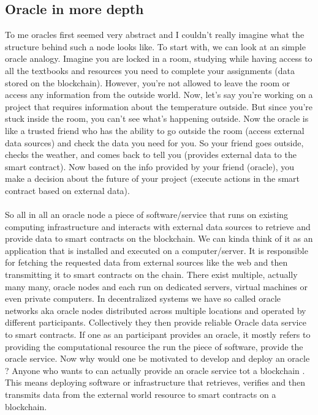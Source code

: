 \documentclass{article}
\begin{document}
\subsection{Oracle in more depth}
To me oracles first seemed very abstract and I couldn't really imagine what the structure behind such a node looks like. To start with, we can look at an simple oracle analogy. Imagine you are locked in a room, studying while having access to all the textbooks and resources you need to complete your assignments (data stored on the blockchain). However, you're not allowed to leave the room or access any information from the outside world. Now, let's say you're working on a project that requires information about the temperature outside. But since you're stuck inside the room, you can't see what's happening outside. Now the oracle is like a trusted friend who has the ability to go outside the room (access external data sources) and check the data you need for you. So your friend goes outside, checks the weather, and comes back to tell you (provides external data to the smart contract). Now based on the info provided by your friend (oracle), you make a decision about the future of your project (execute actions in the smart contract based on external data).
\\
\\
So all in all an oracle node a piece of software/service that runs on existing computing infrastructure and interacts with external data sources to retrieve and provide data to smart contracts on the blockchain. We can kinda think of it as an application that is installed and executed on a computer/server. It is responsible for fetching the requested data from external sources like the web and then transmitting it to smart contracts on the chain. There exist multiple, actually many many, oracle nodes and each run on dedicated servers, virtual machines or even private computers. In decentralized systems we have so called oracle networks aka oracle nodes distributed across multiple locations and operated by different participants. Collectively they then provide reliable Oracle data service to smart contracts. If one as an participant provides an oracle, it mostly refers to providing the computational resource the run the piece of software, provide the oracle service. Now why would one be motivated to develop and deploy an oracle ? Anyone who wants to can actually provide an oracle service tot  a blockchain . This means deploying software or infrastructure that retrieves, verifies and then transmits data from the external world resource to smart contracts on a blockchain. 
\end{document}
